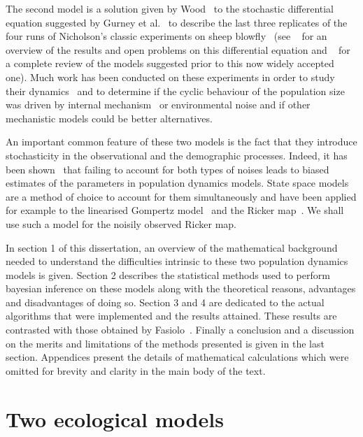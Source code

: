 \documentclass[12pt]{article}
\begin{document}
	The second model is a solution given by Wood~\cite{wood2010statistical} to the stochastic differential equation suggested by Gurney et al.~\cite{gurney1980nicholson} to describe the last three replicates of the four runs of Nicholson’s classic experiments on sheep blowfly~\cite{nicholson1954outline, nicholson1957self} (see ~\cite{berezansky2010nicholson} for an overview of the results and open problems on this differential equation and ~\cite{oster1978population} for a complete review of the models suggested prior to this now widely accepted one). Much work has been conducted on these experiments in order to study their dynamics~\cite{brillinger1980empirical, brillinger2012nicholson} and to determine if the cyclic behaviour of the population size was driven by internal mechanism~\cite{gurney1980nicholson, wood2010statistical} or environmental noise and if other mechanistic models could be better alternatives\cite{kendall1999populations}.
	
	An important common feature of these two models is the fact that they introduce stochasticity in the observational and the demographic processes. Indeed, it has been shown~\cite{stenseth2003seasonality, carroll2006measurement, freckleton2006census} that failing to account for both types of noises leads to biased estimates of the parameters in population dynamics models. State space models are a method of choice to account for them simultaneously and have been applied for example to the linearised Gompertz model~\cite{meyer1999bugs, viljugrein2005density, wang2006spatial} and the Ricker map~\cite{de2002fitting, calder2003incorporating}. We shall use such a model for the noisily observed Ricker map.
	
	In section 1 of this dissertation, an overview of the mathematical background needed to understand the difficulties intrinsic to these two population dynamics models is given. Section 2 describes the statistical methods used to perform bayesian inference on these models along with the theoretical reasons, advantages and disadvantages of doing so. Section 3 and 4 are dedicated to the actual algorithms that were implemented and the results attained. These results are contrasted with those obtained by Fasiolo~\cite{fasiolo2014statistical}. Finally a conclusion and a discussion on the merits and limitations of the methods presented is given in the last section. Appendices present the details of mathematical calculations which were omitted for brevity and clarity in the main body of the text.
	
	\clearpage
	\section{Two ecological models}
\end{document}
